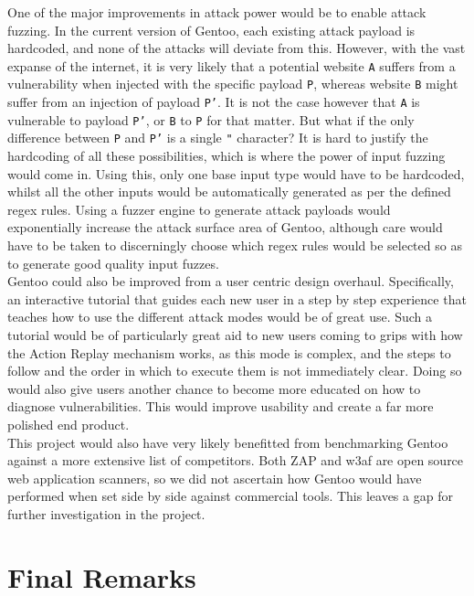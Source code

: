 One of the major improvements in attack power would be to enable attack fuzzing. In the current version of Gentoo, each existing attack payload is hardcoded, and none of the attacks will deviate from this. However, with the vast expanse of the internet, it is very likely that a potential website \texttt{A} suffers from a vulnerability when injected with the specific payload \texttt{P}, whereas website \texttt{B} might suffer from an injection of payload \texttt{P'}. It is not the case however that \texttt{A} is vulnerable to payload \texttt{P'}, or \texttt{B} to \texttt{P}
 for that matter. But what if the only difference between \texttt{P} and \texttt{P'} is a single \texttt{"} character? It is hard to justify the hardcoding of all these possibilities, which is where the power of input fuzzing would come in. Using this, only one base input type would have to be hardcoded, whilst all the other inputs would be automatically generated as per the defined regex rules. Using a fuzzer engine to generate attack payloads would exponentially increase the attack surface area of Gentoo, although care would have to be taken to discerningly choose which regex rules would be selected so as to generate good quality input fuzzes. \\
 
 Gentoo could also be improved from a user centric design overhaul. Specifically, an interactive tutorial that guides each new user in a step by step experience that teaches how to use the different attack modes would be of great use. Such a tutorial would be of particularly great aid to new users coming to grips with how the Action Replay mechanism works, as this mode is complex, and the steps to follow and the order in which to execute them is not immediately clear. Doing so would also give users another chance to become more educated on how to diagnose vulnerabilities. This would improve usability and create a far more polished end product. \\
 
 This project would also have very likely benefitted from benchmarking Gentoo against a more extensive list of competitors. Both ZAP and w3af are open source web application scanners, so we did not ascertain how Gentoo would have performed when set side by side against commercial tools. This leaves a gap for further investigation in the project. \\



\section{Final Remarks}


